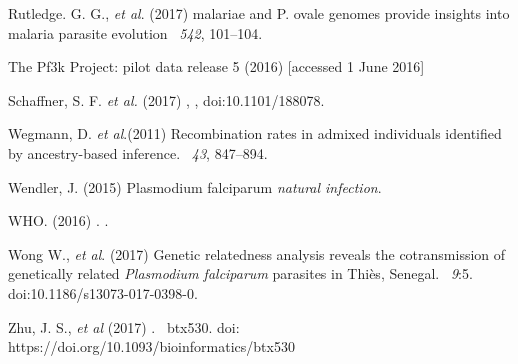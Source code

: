 \documentclass{article}
\begin{document}
\begin{thebibliography}{}
Rutledge. G. G., {\em et al}. (2017)
 malariae and P. ovale genomes provide insights into malaria parasite evolution
~{\em 542}, 101--104.

The Pf3k Project: pilot data release 5 (2016)
 [accessed 1 June 2016]

Schaffner, S. F. {\em et al.} (2017)
,
, doi:10.1101/188078.

Wegmann, D. {\em et al}.(2011)
\newblock Recombination rates in admixed individuals identified by ancestry-based inference.
~{\em 43\/}, 847--894.

Wendler, J. (2015)
 {P}lasmodium falciparum {\em natural infection}.

WHO. (2016)
.
.

Wong W., {\em et al}. (2017)
\newblock Genetic relatedness analysis reveals the cotransmission of genetically related {\it Plasmodium falciparum} parasites in Thiès, Senegal.
~{\em 9}:5. doi:10.1186/s13073-017-0398-0.

Zhu, J. S., {\em et al} (2017)
.
~{\em \/}btx530. doi: https://doi.org/10.1093/bioinformatics/btx530

\end{thebibliography}
\end{document}
